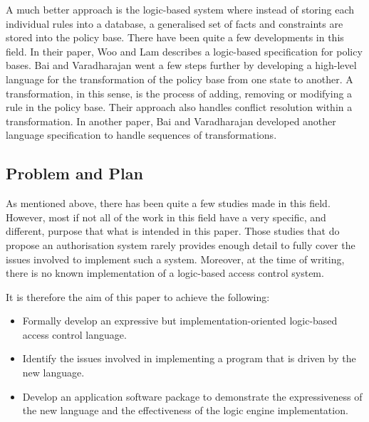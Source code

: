 \documentclass[a4paper,draft]{article}
\begin{document}
      A much better approach is the logic-based system where instead of
      storing each individual rules into a database, a generalised set of
      facts and constraints are stored into the policy base. There have been
      quite a few developments in this field. In their paper, Woo and Lam
      \cite{WL} describes a logic-based specification for policy bases. Bai and
      Varadharajan \cite{BV1} went a few steps further by developing a
      high-level language for the transformation of the policy base from one
      state to another. A transformation, in this sense, is the process of
      adding, removing or modifying a rule in the policy base. Their approach
      also handles conflict resolution within a transformation. In another
      paper, Bai and Varadharajan \cite{BV2} developed another language
      specification to handle sequences of transformations.

    \subsection{Problem and Plan}

      As mentioned above, there has been quite a few studies made in this
      field. However, most if not all of the work in this field have a very
      specific, and different, purpose that what is intended in this paper.
      Those studies that do propose an authorisation system rarely provides
      enough detail to fully cover the issues involved to implement such a
      system. Moreover, at the time of writing, there is no known
      implementation of a logic-based access control system.

      It is therefore the aim of this paper to achieve the following:

      \begin{itemize}
        \item
          Formally develop an expressive but implementation-oriented
          logic-based access control language.
        \item
          Identify the issues involved in implementing a program that is
          driven by the new language.
        \item
          Develop an application software package to demonstrate the
          expressiveness of the new language and the effectiveness of the
          logic engine implementation.
          
      \end{itemize}
\end{document}
